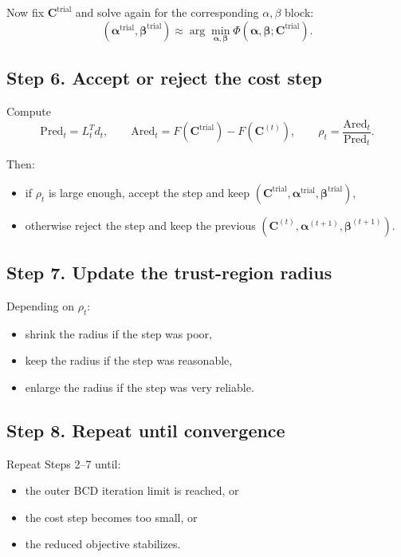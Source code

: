 \documentclass[11pt]{article}
\newcommand{\betavec}{\boldsymbol{\beta}}
\newcommand{\alphavec}{\boldsymbol{\alpha}}
\newcommand{\costvec}{\mathbf{C}}
\begin{document}
Now fix $\costvec^{\mathrm{trial}}$ and solve again for the corresponding
$\alpha,\beta$ block:
\begin{equation}
\label{eq:block-a-trial}
(\alphavec^{\mathrm{trial}}, \betavec^{\mathrm{trial}})
\approx
\arg\min_{\alphavec, \betavec}
\Phi(\alphavec, \betavec; \costvec^{\mathrm{trial}}).
\end{equation}

\subsection*{Step 6. Accept or reject the cost step}

Compute
\begin{equation}
\label{eq:acceptance-terms}
\mathrm{Pred}_t = L_t^T d_t,
\qquad
\mathrm{Ared}_t = F(\costvec^{\mathrm{trial}}) - F(\costvec^{(t)}),
\qquad
\rho_t = \frac{\mathrm{Ared}_t}{\mathrm{Pred}_t}.
\end{equation}

Then:
\begin{itemize}
  \item if $\rho_t$ is large enough, accept the step and keep
  $(\costvec^{\mathrm{trial}}, \alphavec^{\mathrm{trial}}, \betavec^{\mathrm{trial}})$,
  \item otherwise reject the step and keep the previous
  $(\costvec^{(t)}, \alphavec^{(t+1)}, \betavec^{(t+1)})$.
\end{itemize}

\subsection*{Step 7. Update the trust-region radius}

Depending on $\rho_t$:
\begin{itemize}
  \item shrink the radius if the step was poor,
  \item keep the radius if the step was reasonable,
  \item enlarge the radius if the step was very reliable.
\end{itemize}

\subsection*{Step 8. Repeat until convergence}

Repeat Steps 2--7 until:
\begin{itemize}
  \item the outer BCD iteration limit is reached, or
  \item the cost step becomes too small, or
  \item the reduced objective stabilizes.
\end{itemize}
\end{document}
